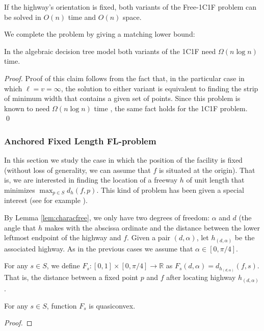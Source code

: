 \documentclass{llncs}
\def\R{\mathbb{R}}
\begin{document}
\begin{corollary}\label{cor_fixedor}
If the highway's orientation is fixed, both variants of the Free-1C1F problem can be solved in $O(n)$ time and $O(n)$ space.
\end{corollary}

We complete the problem by giving a matching lower bound:

\begin{theorem}\label{theo_lowerFL1C1F}
In the algebraic decision tree model both variants of the 1C1F need $\Omega(n\log n)$ time.
\end{theorem}
\begin{proof}
Proof of this claim follows from the fact that, in the particular case in which $\ell=v=\infty$, the solution to either variant is equivalent to finding the strip of minimum width that contains a given set of points. Since this problem is known to need $\Omega(n\log n)$ time \cite{lw-gcslp-86}, the same fact holds for the 1C1F problem. \qed
\end{proof}

\iffalse
\subsubsection{Anchored Fixed Length FL-problem}


In this section we study the case in which the position of the facility is fixed (without loss of generality, we can assume that $f$ is situated at the origin). That is, we are interested in finding the location of a freeway $h$ of unit length that minimizes $\max_{p\in S}d_h(f,p)$. This kind of problem has been given a special interest (see for example \cite{ahn09,kt-oishcm-08}). 

By Lemma \ref{lem:characfree}, we only have two degrees of freedom: $\alpha$ and $d$ (the angle that $h$ makes with the abscissa ordinate and the distance between the lower leftmost endpoint of the highway and $f$. Given a pair $(d,\alpha)$, let $h_{(d,\alpha)}$ be the associated highway. As in the previous cases we assume that $\alpha \in [0,\pi/4]$.

For any $s\in S$, we define $F_s:[0,1]\times [0,\pi/4]\rightarrow \R$ as $F_s(d,\alpha)=d_{h_{(d,\alpha)}}(f,s)$. That is, the distance between a fixed point $p$ and $f$ after locating highway $h_{(d,\alpha)}$.

\begin{lemma}
For any $s\in S$, function $F_s$ is quasiconvex.
\end{lemma}
\begin{proof}
\end{proof}
\end{document}
